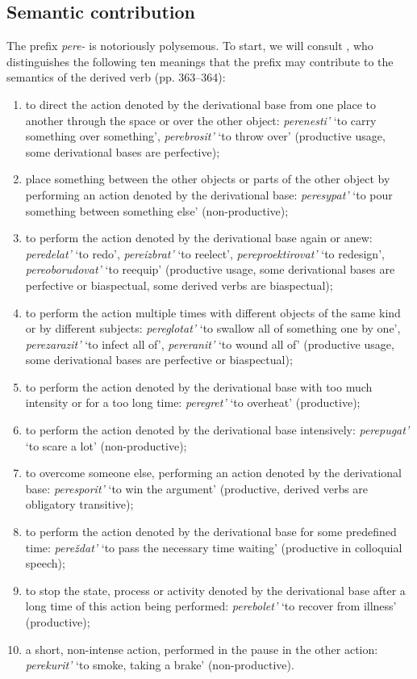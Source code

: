 \subsection{Semantic contribution}
The prefix \textit{pere-} is notoriously polysemous. To start, we will consult \citet{Shvedova:82}, who distinguishes the following ten meanings that the prefix may contribute to the semantics of the derived verb (pp. 363--364):
\begin{enumerate}
\item to direct the action denoted by the derivational base from one place to another through the space or over the other object: \textit{perenesti'} `to carry something over something', \textit{perebrosit'} `to throw over' (productive usage, some derivational bases are perfective); 
\item place something between the other objects or parts of the other object by performing an action denoted by the derivational base: \textit{peresypat'} `to pour something between something else' (non-productive); 
\item to perform the action denoted by the derivational base again or anew: \textit{peredelat'} `to redo', \textit{pereizbrat'} `to reelect', \textit{pereproektirovat'} `to redesign', \textit{pereoborudovat'} `to reequip' (productive usage, some derivational bases are perfective or biaspectual, some derived verbs are biaspectual);
\item to perform the action multiple times with different objects of the same kind or by different subjects: \textit{pereglotat'} `to swallow all of something one by one', \textit{perezarazit'} `to infect all of', \textit{pereranit'} `to wound all of' (productive usage, some derivational bases are perfective or biaspectual);
\item to perform the action denoted by the derivational base with too much intensity or for a too long time: \textit{peregret'} `to overheat' (productive); 
\item to perform the action denoted by the derivational base intensively: \textit{perepugat'} `to scare a lot' (non-productive); 
\item to overcome someone else, performing an action denoted by the derivational base: \textit{peresporit'} `to win the argument' (productive, derived verbs are obligatory transitive); 
\item to perform the action denoted by the derivational base for some predefined time: \textit{pere\v{z}dat'} `to pass the necessary time waiting' (productive in colloquial speech);
\item to stop the state, process or activity denoted by the derivational base after a long time of this action being performed: \textit{perebolet'} `to recover from illness' (productive); 
\item a short, non-intense action, performed in the pause in the other action: \textit{perekurit'} `to smoke, taking a brake' (non-productive).
\end{enumerate} 

